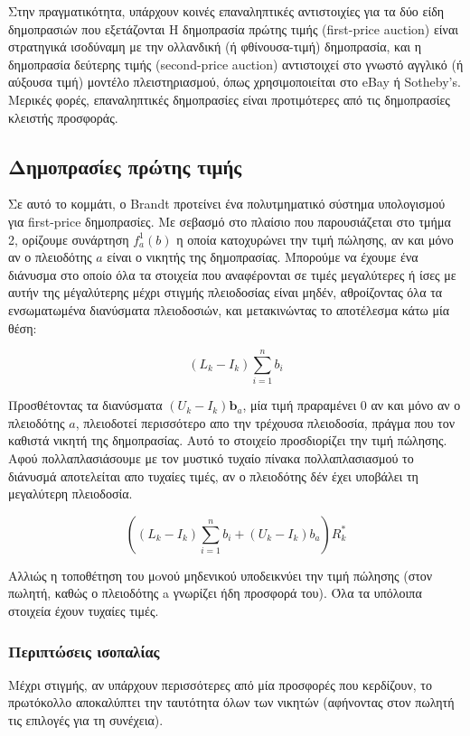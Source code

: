 \documentclass[a4paper,11pt]{article}
\begin{document}
Στην πραγματικότητα, υπάρχουν κοινές επαναληπτικές αντιστοιχίες για τα δύο είδη δημοπρασιών που εξετάζονται Η δημοπρασία πρώτης τιμής (first-price
auction) είναι στρατηγικά ισοδύναμη με την ολλανδική (ή φθίνουσα-τιμή) δημοπρασία, και η δημοπρασία δεύτερης τιμής (second-price auction)
αντιστοιχεί στο γνωστό αγγλικό (ή αύξουσα τιμή) μοντέλο πλειστηριασμού, όπως χρησιμοποιείται στο eBay ή Sotheby's. Μερικές φορές, επαναληπτικές
δημοπρασίες είναι προτιμότερες από τις δημοπρασίες κλειστής προσφοράς.

	\subsection{Δημοπρασίες πρώτης τιμής} Σε αυτό το κομμάτι, ο Brandt προτείνει ένα πολυτμηματικό σύστημα υπολογισμού για first-price δημοπρασίες. Με
σεβασμό στο πλαίσιο που παρουσιάζεται στο τμήμα 2, ορίζουμε συνάρτηση $f_a^1(b)$ η οποία κατοχυρώνει την τιμή πώλησης, αν και μόνο αν ο πλειοδότης $a$
είναι ο νικητής της δημοπρασίας. Μπορούμε να έχουμε ένα διάνυσμα στο οποίο όλα τα στοιχεία που αναφέρονται σε τιμές μεγαλύτερες ή ίσες με αυτήν της
μέγαλύτερης μέχρι στιγμής πλειοδοσίας είναι μηδέν, αθροίζοντας όλα τα ενσωματωμένα διανύσματα πλειοδοσιών, και μετακινώντας το αποτέλεσμα κάτω μία
θέση:

\begin{displaymath}
	(L_k-I_k) \sum_{i=1}^{n} b_i
\end{displaymath}

Προσθέτοντας τα διανύσματα $(U_k − I_k )\textbf{b}_a$, μία τιμή πραραμένει 0 αν και μόνο αν ο πλειοδότης $a$, πλειοδοτεί περισσότερο απο την
τρέχουσα πλειοδοσία, πράγμα που τον καθιστά νικητή της δημοπρασίας. Αυτό το στοιχείο προσδιορίζει την τιμή πώλησης. Αφού πολλαπλασιάσουμε με τον
μυστικό τυχαίο πίνακα πολλαπλασιασμού το διάνυσμά αποτελείται απο τυχαίες τιμές, αν ο πλειοδότης δέν έχει υποβάλει τη μεγαλύτερη πλειοδοσία.

\begin{displaymath}
	\left ( (L_k-I_k) \sum_{i=1}^{n} b_i + (U_k - I_k)b_a \right ) R^*_k
\end{displaymath}

Αλλιώς η τοποθέτηση του μoνού μηδενικού υποδεικνύει την τιμή πώλησης (στον πωλητή, καθώς ο πλειοδότης a γνωρίζει ήδη προσφορά του). Όλα τα υπόλοιπα
στοιχεία έχουν τυχαίες τιμές.

\subsubsection{Περιπτώσεις ισοπαλίας}
Μέχρι στιγμής, αν υπάρχουν περισσότερες από μία προσφορές που κερδίζουν, το πρωτόκολλο αποκαλύπτει την ταυτότητα όλων των νικητών (αφήνοντας στον
πωλητή τις επιλογές για τη συνέχεια).
\end{document}
